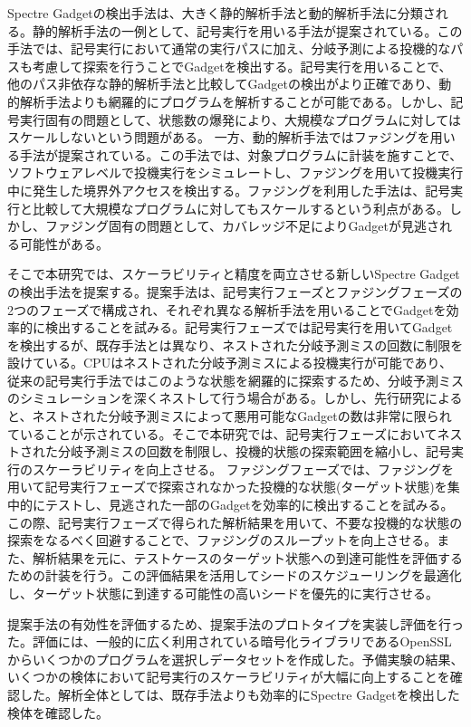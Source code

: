 Spectre Gadgetの検出手法は、大きく静的解析手法\cite{Spectre-Scanner,wang2018oo7,guarnieri2020spectector,wang2020kleespectre}と動的解析手法\cite{oleksenko2020specfuzz,qi2021spectaint,johannesmeyer2022kasper}に分類される。静的解析手法の一例として、記号実行を用いる手法\cite{guarnieri2020spectector,wang2020kleespectre}が提案されている。この手法では、記号実行において通常の実行パスに加え、分岐予測による投機的なパスも考慮して探索を行うことでGadgetを検出する。記号実行を用いることで、他のパス非依存な静的解析手法と比較してGadgetの検出がより正確であり、動的解析手法よりも網羅的にプログラムを解析することが可能である。しかし、記号実行固有の問題として、状態数の爆発により、大規模なプログラムに対してはスケールしないという問題がある。
一方、動的解析手法ではファジングを用いる手法\cite{oleksenko2020specfuzz,qi2021spectaint,johannesmeyer2022kasper}が提案されている。この手法では、対象プログラムに計装を施すことで、ソフトウェアレベルで投機実行をシミュレートし、ファジングを用いて投機実行中に発生した境界外アクセスを検出する。ファジングを利用した手法は、記号実行と比較して大規模なプログラムに対してもスケールするという利点がある。しかし、ファジング固有の問題として、カバレッジ不足によりGadgetが見逃される可能性がある。

そこで本研究では、スケーラビリティと精度を両立させる新しいSpectre Gadgetの検出手法を提案する。提案手法は、記号実行フェーズとファジングフェーズの2つのフェーズで構成され、それぞれ異なる解析手法を用いることでGadgetを効率的に検出することを試みる。記号実行フェーズでは記号実行を用いてGadgetを検出するが、既存手法\cite{guarnieri2020spectector,wang2020kleespectre}とは異なり、ネストされた分岐予測ミスの回数に制限を設けている。CPUはネストされた分岐予測ミスによる投機実行が可能であり\cite{mambretti2019speculator}、従来の記号実行手法ではこのような状態を網羅的に探索するため、分岐予測ミスのシミュレーションを深くネストして行う場合がある。しかし、先行研究\cite{oleksenko2020specfuzz}によると、ネストされた分岐予測ミスによって悪用可能なGadgetの数は非常に限られていることが示されている。そこで本研究では、記号実行フェーズにおいてネストされた分岐予測ミスの回数を制限し、投機的状態の探索範囲を縮小し、記号実行のスケーラビリティを向上させる。
ファジングフェーズでは、ファジングを用いて記号実行フェーズで探索されなかった投機的な状態(ターゲット状態)を集中的にテストし、見逃された一部のGadgetを効率的に検出することを試みる。この際、記号実行フェーズで得られた解析結果を用いて、不要な投機的な状態の探索をなるべく回避することで、ファジングのスループットを向上させる。また、解析結果を元に、テストケースのターゲット状態への到達可能性を評価するための計装を行う。この評価結果を活用してシードのスケジューリングを最適化し、ターゲット状態に到達する可能性の高いシードを優先的に実行させる。\par
提案手法の有効性を評価するため、提案手法のプロトタイプを実装し評価を行った。評価には、一般的に広く利用されている暗号化ライブラリであるOpenSSL\cite{OpenSSL}からいくつかのプログラムを選択しデータセットを作成した。予備実験の結果、いくつかの検体において記号実行のスケーラビリティが大幅に向上することを確認した。解析全体としては、既存手法よりも効率的にSpectre Gadgetを検出した検体を確認した。\par

